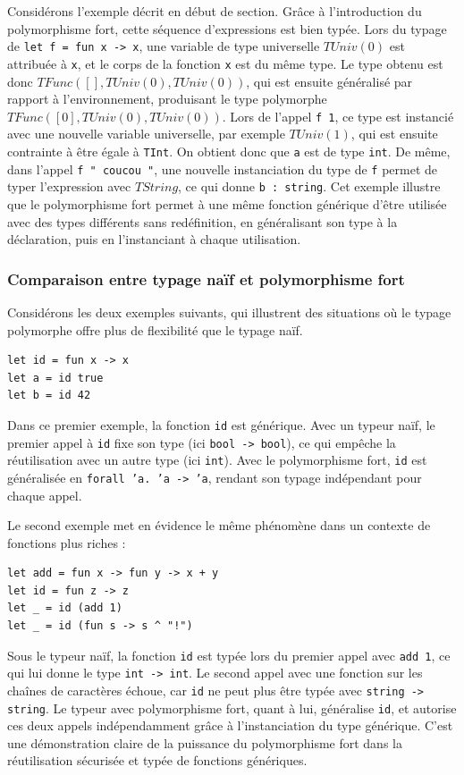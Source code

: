 Considérons l'exemple décrit en début de section. Grâce à l'introduction du polymorphisme fort, cette séquence d'expressions est bien typée. 
Lors du typage de \texttt{let f = fun x -> x}, une variable de type universelle $TUniv(0)$ est attribuée à \texttt{x}, et le corps de la fonction \texttt{x} est du même type. 
Le type obtenu est donc $TFunc([], TUniv(0), TUniv(0))$, qui est ensuite généralisé par rapport à l'environnement, produisant le type polymorphe $TFunc([0], TUniv(0), TUniv(0))$. 
Lors de l'appel \texttt{f 1}, ce type est instancié avec une nouvelle variable universelle, par exemple $TUniv(1)$, qui est ensuite contrainte à être égale à \texttt{TInt}. 
On obtient donc que \texttt{a} est de type \texttt{int}. De même, dans l'appel \texttt{f " coucou "}, une nouvelle instanciation du type de \texttt{f} permet de typer l'expression avec $TString$, ce qui donne \texttt{b : string}. 
Cet exemple illustre que le polymorphisme fort permet à une même fonction générique d’être utilisée avec des types différents sans redéfinition, en généralisant son type à la déclaration, puis en l'instanciant à chaque utilisation.

\subsubsection{Comparaison entre typage naïf et polymorphisme fort}

Considérons les deux exemples suivants, qui illustrent des situations où le typage polymorphe offre plus de flexibilité que le typage naïf.

\begin{lstlisting}
let id = fun x -> x
let a = id true
let b = id 42
\end{lstlisting}

Dans ce premier exemple, la fonction \texttt{id} est générique. Avec un typeur naïf, le premier appel à \texttt{id} fixe son type (ici \texttt{bool -> bool}), ce qui empêche la réutilisation avec un autre type (ici \texttt{int}).
Avec le polymorphisme fort, \texttt{id} est généralisée en \texttt{forall 'a. 'a -> 'a}, rendant son typage indépendant pour chaque appel.

Le second exemple met en évidence le même phénomène dans un contexte de fonctions plus riches :

\begin{lstlisting}
let add = fun x -> fun y -> x + y
let id = fun z -> z
let _ = id (add 1)
let _ = id (fun s -> s ^ "!")
\end{lstlisting}

Sous le typeur naïf, la fonction \texttt{id} est typée lors du premier appel avec \texttt{add 1}, ce qui lui donne le type \texttt{int -> int}.
Le second appel avec une fonction sur les chaînes de caractères échoue, car \texttt{id} ne peut plus être typée avec \texttt{string -> string}.
Le typeur avec polymorphisme fort, quant à lui, généralise \texttt{id}, et autorise ces deux appels indépendamment grâce à l'instanciation du type générique.
C'est une démonstration claire de la puissance du polymorphisme fort dans la réutilisation sécurisée et typée de fonctions génériques.